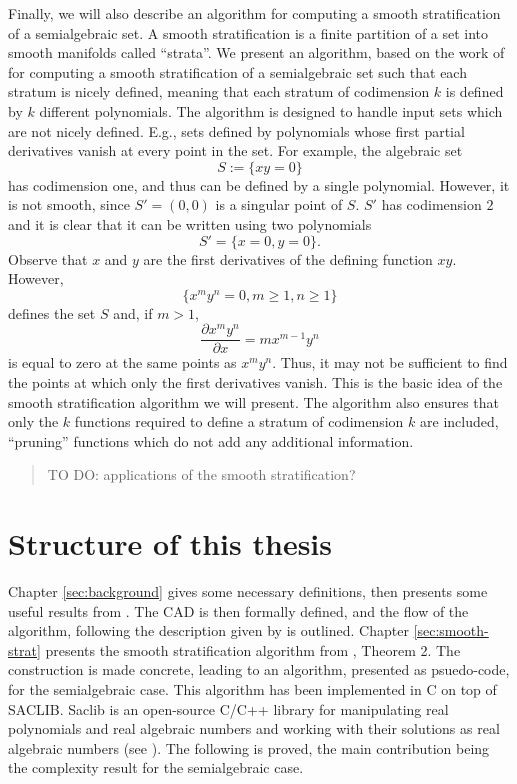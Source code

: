 \documentclass[
]{book}
\theoremstyle{definition}
\theoremstyle{definition}
\theoremstyle{definition}
\theoremstyle{definition}
\theoremstyle{remark}
\begin{document}
Finally, we will also describe an algorithm for computing a smooth stratification of a semialgebraic set. A smooth stratification is a finite partition of a set into smooth manifolds called ``strata''. We present an algorithm, based on the work of \citet{gv1995} for computing a smooth stratification of a semialgebraic set such that each stratum is nicely defined, meaning that each stratum of codimension \(k\) is defined by \(k\) different polynomials.
The algorithm is designed to handle input sets which are not nicely defined. E.g., sets defined by polynomials whose first partial derivatives vanish at every point in the set.
For example, the algebraic set
\[
S := \{ x y = 0 \}
\]
has codimension one, and thus can be defined by a single polynomial. However, it is not smooth, since \(S' = (0,0)\) is a singular point of \(S\). \(S'\) has codimension \(2\) and it is clear that it can be written using two polynomials
\[
S' = \{ x = 0, y = 0 \}.
\]
Observe that \(x\) and \(y\) are the first derivatives of the defining function \(xy\). However,
\[
\{ x^m y^n = 0, m \ge 1, n \ge 1 \}
\]
defines the set \(S\) and, if \(m > 1\),
\[
\dfrac{\partial x^m y^n}{\partial x} = m x^{m-1} y^n
\]
is equal to zero at the same points as \(x^my^n\). Thus, it may not be sufficient to find the points at which only the first derivatives vanish. This is the basic idea of the smooth stratification algorithm we will present.
The algorithm also ensures that only the \(k\) functions required to define a stratum of codimension \(k\) are included, ``pruning'' functions which do not add any additional information.

\begin{quote}
TO DO: applications of the smooth stratification?
\end{quote}

\hypertarget{structure-of-this-thesis}{%
\section{Structure of this thesis}\label{structure-of-this-thesis}}

Chapter \ref{sec:background} gives some necessary definitions, then presents some useful results from \citet{bgv15}. The CAD
is then formally defined, and the flow of the algorithm, following the description given by \citet{coste2000} is outlined.
Chapter \ref{sec:smooth-strat} presents the smooth stratification algorithm from \citet{gv1995}, Theorem 2.
The construction is made concrete, leading to an algorithm, presented as psuedo-code, for the semialgebraic case. This algorithm has been implemented in C on top of SACLIB. Saclib is an open-source C/C++ library for manipulating real polynomials and real algebraic numbers and working with their solutions as real algebraic numbers (see \citet{saclib}).
The following is proved, the main contribution being the complexity result for the semialgebraic case.
\end{document}
